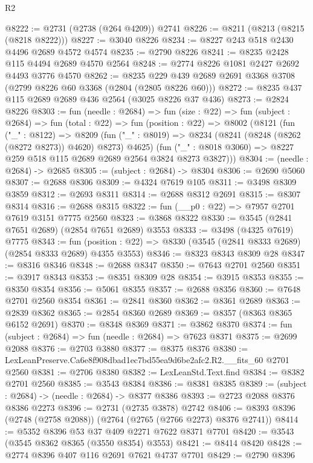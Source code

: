 \begin{lexlean}{R2}
\begin{coremodule}
@8222 := @2731 (@2738 (@264 @4209)) @2741
@8226 := @8211 (@8213 (@8215 (@8218 @8222)))
@8227 := @3040 @8226
@8234 := @8227 @243 @518 @2430 @4496 @2689 @4572 @4574
@8235 := @2790 @8226
@8241 := @8235 @2428 @115 @4494 @2689 @4570 @2564
@8248 := @2774 @8226 @1081 @2427 @2692 @4493 @3776 @4570
@8262 := @8235 @229 @439 @2689 @2691 @3368 @3708 (@2799 @8226 @60 @3368 (@2804 (@2805 @8226 @60)))
@8272 := @8235 @437 @115 @2689 @2689 @436 @2564 (@3025 @8226 @37 @436)
@8273 := @2824 @8226
@8303 := fun (needle : @2684) =>
  fun (size : @22) =>
  fun (subject : @2684) =>
  fun (total : @22) =>
  fun (position : @22) =>
  @8002
    (@8121
      (fun ("_" : @8122) =>
      @8209
        (fun ("_" : @8019) => @8234 (@8241 (@8248 (@8262 (@8272 @8273)) @4620) @8273) @4625)
        (fun ("_" : @8018 @3060) => @8227 @259 @518 @115 @2689 @2689 @2564 @3824 @8273 @3827)))
@8304 := (needle : @2684) -> @2685
@8305 := (subject : @2684) -> @8304
@8306 := @2690 @5060
@8307 := @2688 @8306
@8309 := @4324 @7619 @105
@8311 := @3498 @8309 @3859
@8312 := @2693 @8311
@8314 := @2688 @8312 @2691
@8315 := @8307 @8314
@8316 := @2688 @8315
@8322 := fun (__p0 : @22) => @7957 @2701 @7619 @3151 @7775 @2560
@8323 := @3868 @8322
@8330 := @3545 (@2841 @7651 @2689) (@2854 @7651 @2689) @3553
@8333 := @3498 (@4325 @7619) @7775
@8343 := fun (position : @22) => @8330 (@3545 (@2841 @8333 @2689) (@2854 @8333 @2689) @4355 @3553)
@8346 := @8323 @8343 @8309 @28
@8347 := @8316 @8346
@8348 := @2688 @8347
@8350 := @7643 @2701 @2560
@8351 := @3917 @8343
@8353 := @8351 @8309 @28
@8354 := @3915 @8353
@8355 := @8350 @8354
@8356 := @5061 @8355
@8357 := @2688 @8356
@8360 := @7648 @2701 @2560 @8354
@8361 := @2841 @8360
@8362 := @8361 @2689
@8363 := @2839 @8362
@8365 := @2854 @8360 @2689
@8369 := @8357 (@8363 @8365 @6152 @2691)
@8370 := @8348 @8369
@8371 := @3862 @8370
@8374 := fun (subject : @2684) => fun (needle : @2684) => @7623 @8371
@8375 := @2699 @2088
@8376 := @2703 @3880
@8377 := @8375 @8376
@8380 := LexLeanPreserve.Ca6e8f908dbad1ec7bd55ea9d6be2afc2.R2.__fits_60 @2701 @2560
@8381 := @2706 @8380
@8382 := LexLeanStd.Text.find
@8384 := @8382 @2701 @2560
@8385 := @3543 @8384
@8386 := @8381 @8385
@8389 := (subject : @2684) -> (needle : @2684) -> @8377 @8386
@8393 := @2723 @2088 @8376 @8386 @2273
@8396 := @2731 (@2735 @3878) @2742
@8406 := @8393 @8396 (@2748 (@2758 @2088)) (@2764 (@2765 (@2766 @2273) @8376 @2741))
@8414 := @5352 @8396 @53 @37 @409 @2271 @7622 @8371 @7701
@8420 := @3543 (@3545 @8362 @8365 (@3550 @8354) @3553)
@8421 := @8414 @8420
@8428 := @2774 @8396 @407 @116 @2691 @7621 @4737 @7701
@8429 := @2790 @8396

\end{coremodule}
\end{lexlean}

